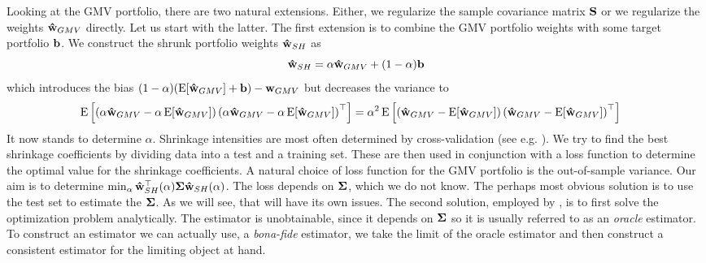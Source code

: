\documentclass[oneside]{book}\usepackage{knitr}
\begin{document}
Looking at the GMV portfolio, there are two natural extensions. 
Either, we regularize the sample covariance matrix $\mathbf{S}$ or we regularize the weights $\mathbf{\hat{w}}_{GMV}$ directly. 
Let us start with the latter. 
The first extension is to combine the GMV portfolio weights with some target portfolio $\mathbf{b}$. 
We construct the shrunk portfolio weights $\mathbf{\hat{w}}_{SH}$ as
\begin{equation}
  \mathbf{\hat{w}}_{SH} = \alpha\mathbf{\hat{w}}_{GMV} + (1-\alpha)\mathbf{b}
\end{equation}
which introduces the bias $(1-\alpha)(\operatorname{E}[\mathbf{\hat{w}}_{GMV}]+\mathbf{b}) - \mathbf{w}_{GMV}$ but decreases the variance to
\begin{align}
  \operatorname{E}\left[\left(\alpha\mathbf{\hat{w}}_{GMV} - \alpha \operatorname{E}[\mathbf{\hat{w}}_{GMV}]\right)\left(\alpha\mathbf{\hat{w}}_{GMV} - \alpha \operatorname{E}[\mathbf{\hat{w}}_{GMV}]\right)^\top\right] 
  & = 
  \alpha^2\operatorname{E}\left[\left(\mathbf{\hat{w}}_{GMV} - \operatorname{E}[\mathbf{\hat{w}}_{GMV}]\right)\left(\mathbf{\hat{w}}_{GMV} - \operatorname{E}[\mathbf{\hat{w}}_{GMV}]\right)^\top\right]
\end{align}
It now stands to determine $\alpha$. 
Shrinkage intensities are most often determined by cross-validation (see e.g. \citet[ch. 5]{james2013introduction}). 
We try to find the best shrinkage coefficients by dividing data into a test and a training set.
These are then used in conjunction with a loss function to determine the optimal value for the shrinkage coefficients.
A natural choice of loss function for the GMV portfolio is the out-of-sample variance.
Our aim is to determine $\min_\alpha \mathbf{\hat{w}}_{SH}^\top(\alpha) \mathbf{\Sigma} \mathbf{\hat{w}}_{SH}(\alpha)$.
The loss depends on $\mathbf{\Sigma}$, which we do not know.
The perhaps most obvious solution is to use the test set to estimate the $\mathbf{\Sigma}$. 
As we will see, that will have its own issues.
The second solution, employed by \citet{bodnar2018estimation}, is to first solve the optimization problem analytically.
The estimator is unobtainable, since it depends on $\mathbf{\Sigma}$ so it is usually referred to as an \textit{oracle} estimator. 
To construct an estimator we can actually use, a \textit{bona-fide} estimator, we take the limit of the oracle estimator and then construct a consistent estimator for the limiting object at hand.
\end{document}
